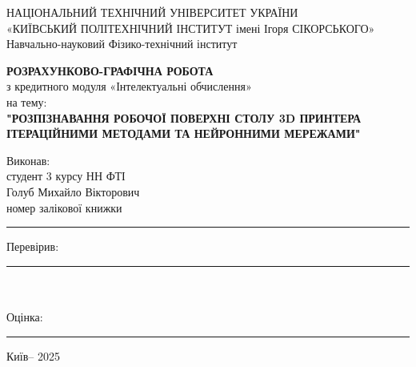 \documentclass[a4paper,14pt]{report}
\begin{document}
\begin{center}
    \normalsize
    НАЦІОНАЛЬНИЙ ТЕХНІЧНИЙ УНІВЕРСИТЕТ УКРАЇНИ \\
    «КИЇВСЬКИЙ ПОЛІТЕХНІЧНИЙ ІНСТИТУТ імені Ігоря СІКОРСЬКОГО» \\
    Навчально-науковий Фізико-технічний інститут
\end{center}

\vspace*{4cm} %

\begin{center}
    \Large \textbf{РОЗРАХУНКОВО-ГРАФІЧНА РОБОТА} \\
    \normalsize з кредитного модуля «Інтелектуальні обчислення» \\
    на тему: \\
    \textbf{"РОЗПІЗНАВАННЯ РОБОЧОЇ ПОВЕРХНІ СТОЛУ 3D ПРИНТЕРА ІТЕРАЦІЙНИМИ МЕТОДАМИ ТА НЕЙРОННИМИ МЕРЕЖАМИ"} \\
\end{center}

\vspace*{4cm} %

\begin{changemargin}{10cm}{0cm} %
    Виконав: \\
    студент 3 курсу НН ФТІ \\
    Голуб Михайло Вікторович \\
    номер залікової книжки \rule{3cm}{0.4pt} %
\end{changemargin}

\vspace*{3cm} %

\begin{changemargin}{10cm}{0cm} %
    Перевірив: \rule{4cm}{0.4pt} \\ \\ %
    Оцінка: \rule{4cm}{0.4pt} %
\end{changemargin}

\vfill %

\begin{center}
    Київ-- 2025
\end{center}
\end{document}

